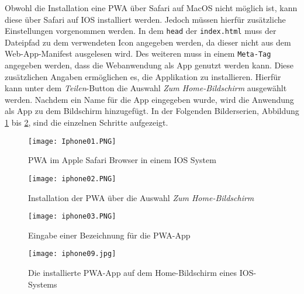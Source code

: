 Obwohl die Installation eine PWA über Safari auf MacOS nicht möglich ist, kann diese über Safari auf IOS installiert werden. Jedoch müssen hierfür zusätzliche Einstellungen vorgenommen werden. In dem \texttt{head} der \texttt{index.html} muss der Dateipfad zu dem verwendeten Icon angegeben werden, da dieser nicht aus dem Web-App-Manifest ausgelesen wird. 
Des weiteren muss in einem \texttt{Meta-Tag} angegeben werden, dass die Webanwendung als App genutzt werden kann. Diese zusätzlichen Angaben ermöglichen es, die Applikation zu installieren. 
Hierfür kann unter dem \textit{Teilen}-Button die Auswahl \textit{Zum Home-Bildschirm} ausgewählt werden. Nachdem ein Name für die App eingegeben wurde, wird die Anwendung als App zu dem Bildschirm hinzugefügt. In der Folgenden Bilderserien, Abbildung \ref{img:iphone01} bis \ref{img:iphone0n}, sind die einzelnen Schritte aufgezeigt. 

\begin{figure}[!htb]
    \begin{minipage}[b]{.4\linewidth} %
       \texttt{[image: Iphone01.PNG]}
       \caption{PWA im Apple Safari Browser in einem IOS System}
       \label{img:iphone01}
    \end{minipage}
    \hspace{.1\linewidth}%
    \begin{minipage}[b]{.4\linewidth} %
       \texttt{[image: iphone02.PNG]}
       \caption{Installation der PWA über die Auswahl \textit{Zum Home-Bildschirm}}
    \end{minipage}
 \end{figure}

 \begin{figure}[!htb]
    \begin{minipage}[b]{.4\linewidth} %
       \texttt{[image: iphone03.PNG]}
       \caption{Eingabe einer Bezeichnung für die PWA-App}
    \end{minipage}
    \hspace{.1\linewidth}%
    \begin{minipage}[b]{.4\linewidth} %
       \texttt{[image: iphone09.jpg]}
       \caption{Die installierte PWA-App auf dem Home-Bildschirm eines IOS-Systems }
       \label{img:iphone0n}
    \end{minipage}
 \end{figure}


